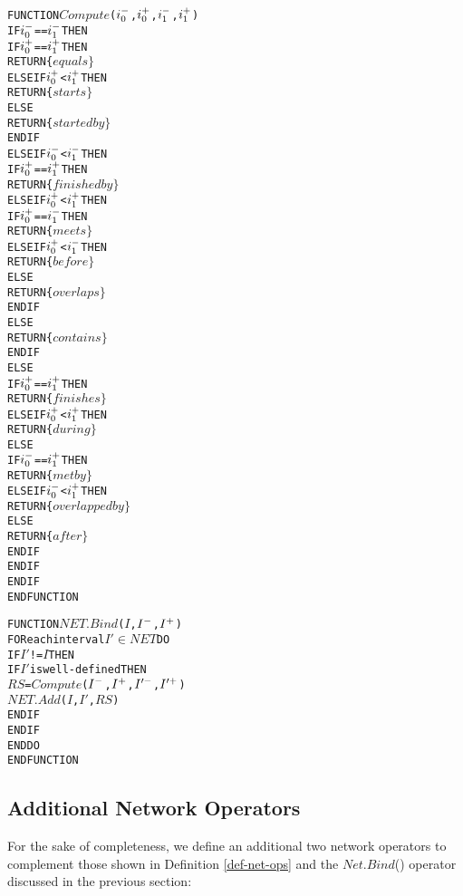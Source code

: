 \documentclass[11pt]{report}
\newenvironment{vverbatim}
{
  \begin{alltt}
}
{
    \vspace{-\baselineskip}
  \end{alltt}
}
\newlength{\valgorithmboxwidth}
\newenvironment{valgorithm}[3][tbhp]
{
  \setlength{\valgorithmboxwidth}{\linewidth-2em}

  \begin{valgorithmfloat}[#1]
    \caption{#2}
    \label{#3}
    \hspace{1em}
    \begin{lrbox}{\valgorithmbox}
      \begin{minipage}[l]{\valgorithmboxwidth}
        \small
        \begin{vverbatim}
}
{
        \end{vverbatim}
      \end{minipage}
    \end{lrbox}
    \framebox[\valgorithmboxwidth][l]{\usebox{\valgorithmbox}}
  \end{valgorithmfloat}
}
\begin{document}
        \begin{valgorithm}[tbhp]{$Compute$()}{algo-comp}
FUNCTION \(Compute\)(\(i\sb{0}\sp{-}\), \(i\sb{0}\sp{+}\), \(i\sb{1}\sp{-}\), \(i\sb{1}\sp{+}\))
  IF \(i\sb{0}\sp{-}\) == \(i\sb{1}\sp{-}\) THEN
    IF \(i\sb{0}\sp{+}\) == \(i\sb{1}\sp{+}\) THEN
      RETURN \{\(equals\}\)
    ELSE IF \(i\sb{0}\sp{+}\) < \(i\sb{1}\sp{+}\) THEN
      RETURN \{\(starts\}\)
    ELSE
      RETURN \{\(started by\}\)
    ENDIF
  ELSE IF \(i\sb{0}\sp{-}\) < \(i\sb{1}\sp{-}\) THEN
    IF \(i\sb{0}\sp{+}\) == \(i\sb{1}\sp{+}\) THEN
      RETURN \{\(finished by\}\)
    ELSE IF \(i\sb{0}\sp{+}\) < \(i\sb{1}\sp{+}\) THEN
      IF \(i\sb{0}\sp{+}\) == \(i\sb{1}\sp{-}\) THEN
        RETURN \{\(meets\}\)
      ELSE IF \(i\sb{0}\sp{+}\) < \(i\sb{1}\sp{-}\) THEN
        RETURN \{\(before\}\)
      ELSE
        RETURN \{\(overlaps\}\)
      ENDIF
    ELSE
      RETURN \{\(contains\}\)
    ENDIF
  ELSE
    IF \(i\sb{0}\sp{+}\) == \(i\sb{1}\sp{+}\) THEN
      RETURN \{\(finishes\}\)
    ELSE IF \(i\sb{0}\sp{+}\) < \(i\sb{1}\sp{+}\) THEN
      RETURN \{\(during\}\)
    ELSE
      IF \(i\sb{0}\sp{-}\) == \(i\sb{1}\sp{+}\) THEN
        RETURN \{\(met by\}\)
      ELSE IF \(i\sb{0}\sp{-}\) < \(i\sb{1}\sp{+}\) THEN
        RETURN \{\(overlapped by\}\)
      ELSE
        RETURN \{\(after\}\)
      ENDIF
    ENDIF
  ENDIF
ENDFUNCTION
        \end{valgorithm}

        \begin{valgorithm}[tbhp]{$Net.Bind$()}{algo-net-bind}
FUNCTION \(NET.Bind\)(\(I\), \(I\sp{-}\), \(I\sp{+}\))
  FOR each interval \(I'\) \(\in\) \(NET\) DO
    IF \(I'\) != \(I\) THEN
      IF \(I'\) is well-defined THEN
        \(RS\) = \(Compute\)(\(I\sp{-}\), \(I\sp{+}\), \(I'\sp{-}\), \(I'\sp{+}\))
        \(NET.Add\)(\(I\), \(I'\), \(RS\))
      ENDIF
    ENDIF
  ENDDO
ENDFUNCTION
        \end{valgorithm}

      \subsection{Additional Network Operators}

        For the sake of completeness, we define an additional two network
        operators to complement those shown in Definition \ref{def-net-ops}
        and the $Net.Bind$() operator discussed in the previous section:
\end{document}
